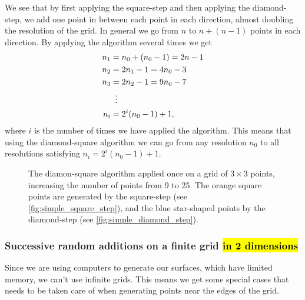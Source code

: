 We see that by first applying the square-step and then applying the diamond-step, we add one point in between each point in each direction, almost doubling the resolution of the grid. In general we go from $n$ to $n + (n-1)$ points in each direction. By applying the algorithm several times we get 
\begin{align}
    n_1 &= n_0 + (n_0-1) = 2n - 1 \nonumber\\
    n_2 &= 2n_1 - 1 = 4n_0 - 3 \nonumber\\
    n_3 &= 2n_2 - 1 = 9n_0 - 7 \nonumber\\
    &\vdotswithin{=} \nonumber\\
    n_i &= 2^i(n_0-1) + 1, \label{eq:diamond_step_resolution}
\end{align}
where $i$ is the number of times we have applied the algorithm. This means that using the diamond-square algorithm we can go from any resolution $n_0$ to all resolutions satisfying $n_i = 2^i(n_0 - 1) + 1$.

\begin{figure}
    \centering
    
    \caption{
        The diamon-square algorithm applied once on a grid of $3\times 3$ points, increasing the number of points from 9 to 25. The orange square points are generated by the square-step (see \cref{fig:simple_square_step}), and the blue star-shaped points by the diamond-step (see \cref{fig:simple_diamond_step}).
    }
    \label{fig:diamond_square_applied}
\end{figure}

\subsubsection{Successive random additions on a finite grid \hl{in 2 dimensions}}
Since we are using computers to generate our surfaces, which have limited memory, we can't use infinite grids. This means we get some special cases that needs to be taken care of when generating points near the edges of the grid.

